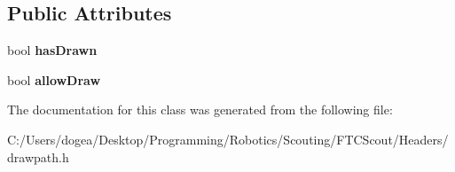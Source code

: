 \subsection*{Public Attributes}
\begin{DoxyCompactItemize}
\item 
\hypertarget{class_draw_path_aad90fa11d471d125a9c4b9cf2b3857af}{}\label{class_draw_path_aad90fa11d471d125a9c4b9cf2b3857af} 
bool {\bfseries has\+Drawn}
\item 
\hypertarget{class_draw_path_a64bfe2eeb358500b9c27caac632d01f2}{}\label{class_draw_path_a64bfe2eeb358500b9c27caac632d01f2} 
bool {\bfseries allow\+Draw}
\end{DoxyCompactItemize}


The documentation for this class was generated from the following file\+:\begin{DoxyCompactItemize}
\item 
C\+:/\+Users/dogea/\+Desktop/\+Programming/\+Robotics/\+Scouting/\+F\+T\+C\+Scout/\+Headers/drawpath.\+h\end{DoxyCompactItemize}
